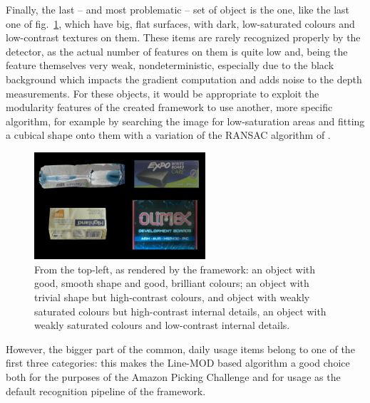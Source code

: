 Finally, the last -- and most problematic -- set of object is the one,
like the last one of fig.~\ref{fig:apc-object-sets}, which have big,
flat surfaces, with dark, low-saturated colours and low-contrast
textures on them. These items are rarely recognized properly by the
detector, as the actual number of features on them is quite low and,
being the feature themselves very weak, nondeterministic, especially
due to the black background which impacts the gradient computation and
adds noise to the depth measurements. For these objects, it would be
appropriate to exploit the modularity features of the created
framework to use another, more specific algorithm, for example by
searching the image for low-saturation areas and fitting a cubical
shape onto them with a variation of the RANSAC algorithm of \cite{ransac}.

\begin{figure}[htbp] 
\centering
\includegraphics[width=2.5in]{./Graphics/apc-object-sets}
\caption{From the top-left, as rendered by the framework: an object
  with good, smooth shape and good, brilliant colours; an object with
  trivial shape but high-contrast colours, and object with weakly
  saturated colours but high-contrast internal details, an object
  with weakly saturated colours and low-contrast internal details.\label{fig:apc-object-sets}}
\end{figure}

However, the bigger part of the common, daily usage items belong to
one of the first three categories: this makes the Line-MOD based
algorithm a good choice both for the purposes of the Amazon Picking
Challenge and for usage as the default recognition pipeline of the
framework.

